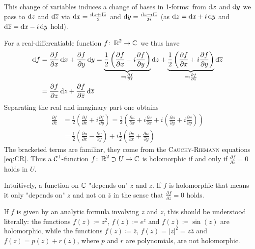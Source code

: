 \documentclass[a4paper,english]{article}
\begin{document}
    This change of variables induces a change of bases in 1-forms: from $\mathop{}\!\mathrm{d} x$ and $\mathop{}\!\mathrm{d} y$ we pass to $\mathop{}\!\mathrm{d} z$ and $\mathop{}\!\mathrm{d} \overline{z}$ via $\mathop{}\!\mathrm{d} x = \frac{\mathop{}\!\mathrm{d} z + \mathop{}\!\mathrm{d} \overline{z}}{2}$ and $\mathop{}\!\mathrm{d} y = \frac{\mathop{}\!\mathrm{d} z - \mathop{}\!\mathrm{d} \overline{z}}{2i}$ (as $\mathop{}\!\mathrm{d} z = \mathop{}\!\mathrm{d} x + i \mathop{}\!\mathrm{d} y$ and $\mathop{}\!\mathrm{d} \overline{z} = \mathop{}\!\mathrm{d} x - i \mathop{}\!\mathrm{d} y$ hold).
    
    For a real-differentiable function $f \colon \operatorname{\mathbb{R}}^2 \to \operatorname{\mathbb{C}}$ we thus have
    \begin{align*}
        \mathop{}\!\mathrm{d} f
        & = \frac{\partial f}{\partial x} \mathop{}\!\mathrm{d} x + \frac{\partial f}{\partial y} \mathop{}\!\mathrm{d} y
        = \underbrace{\frac{1}{2}\left(\frac{\partial f}{\partial x} - i \frac{\partial f}{\partial y}\right)}_{\eqqcolon \frac{\partial f}{\partial z}} \mathop{}\!\mathrm{d} z
        + \underbrace{\frac{1}{2}\left(\frac{\partial f}{\partial x} + i \frac{\partial f}{\partial y}\right)}_{\eqqcolon \frac{\partial f}{\partial \overline{z}}} \mathop{}\!\mathrm{d} \overline{z} \\
        & = \frac{\partial f}{\partial z} \mathop{}\!\mathrm{d} z + \frac{\partial f}{\partial \overline{z}} \mathop{}\!\mathrm{d} \overline{z}
    \end{align*}
    Separating the real and imaginary part one obtains
    \begin{align*}
        \frac{\partial f}{\partial \overline{z}}
        & = \frac{1}{2}\left(\frac{\partial f}{\partial x} + i \frac{\partial f}{\partial y}\right)
        = \frac{1}{2}\left(\frac{\partial u}{\partial x} + i \frac{\partial v}{\partial x}
        + i \left( \frac{\partial u}{\partial y} + i \frac{\partial v}{\partial y}\right)\right) \\
        & = \frac{1}{2}\left( \frac{\partial u}{\partial x} - \frac{\partial v}{\partial y}\right) 
        + i \frac{1}{2}\left( \frac{\partial v}{\partial x} + \frac{\partial u}{\partial y}\right)
    \end{align*}
    The bracketed terms are familiar, they come from the \textsc{Cauchy-Riemann} equations \eqref{eq:CR}.
    Thus a $\operatorname{\mathcal{C}}^1$-function $f \colon \operatorname{\mathbb{R}}^2 \supset U \to \operatorname{\mathbb{C}}$ is holomorphic if and only if \emph{$\frac{\partial f}{\partial \overline{z}} = 0$} holds in $U$.
    
    Intuitively, a function on $\operatorname{\mathbb{C}}$ "depends on" $z$ and $\overline{z}$.
    If $f$ is holomorphic that means it only "depends on" $z$ and not on $\overline{z}$ in the sense that $\frac{\partial f}{\partial \overline{z}} = 0$ holds.
    
    If $f$ is given by an analytic formula involving $z$ and $\overline{z}$, this should be understood literally: the functions $f(z) \coloneqq z^2$, $f(z) \coloneqq e^z$ and $f(z) \coloneqq \sin(z)$ are holomorphic, while the functions $f(z) \coloneqq \overline{z}$, $f(z) = | z |^2 = z\overline{z}$ and $f(z) = p(z) + r(\overline{z})$, where $p$ and $r$ are polynomials, are not holomorphic.
\end{document}
